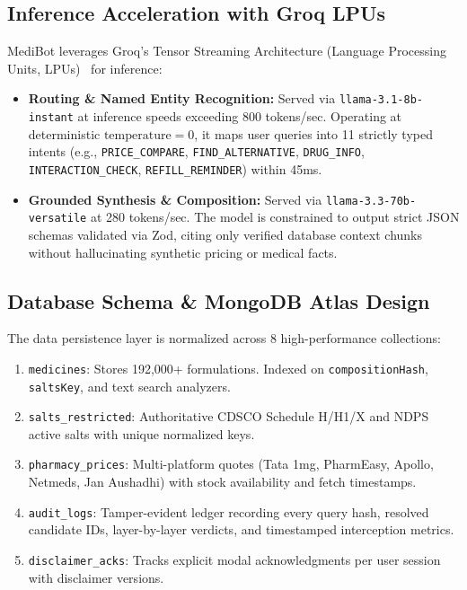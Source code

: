 \documentclass[11pt,a4paper]{article}
\begin{document}
\subsection{Inference Acceleration with Groq LPUs}
MediBot leverages Groq's Tensor Streaming Architecture (Language Processing Units, LPUs)~\cite{groq_lpu_2024} for inference:
\begin{itemize}[leftmargin=*]
  \item \textbf{Routing \& Named Entity Recognition:} Served via \texttt{llama-3.1-8b-instant} at inference speeds exceeding 800 tokens/sec. Operating at deterministic $\text{temperature} = 0$, it maps user queries into 11 strictly typed intents (e.g., \texttt{PRICE\_COMPARE}, \texttt{FIND\_ALTERNATIVE}, \texttt{DRUG\_INFO}, \texttt{INTERACTION\_CHECK}, \texttt{REFILL\_REMINDER}) within 45ms.
  \item \textbf{Grounded Synthesis \& Composition:} Served via \texttt{llama-3.3-70b-versatile} at 280 tokens/sec. The model is constrained to output strict JSON schemas validated via Zod, citing only verified database context chunks without hallucinating synthetic pricing or medical facts.
\end{itemize}

\subsection{Database Schema \& MongoDB Atlas Design}
The data persistence layer is normalized across 8 high-performance collections:
\begin{enumerate}[leftmargin=*]
  \item \texttt{medicines}: Stores 192,000+ formulations. Indexed on \texttt{compositionHash}, \texttt{saltsKey}, and text search analyzers.
  \item \texttt{salts\_restricted}: Authoritative CDSCO Schedule H/H1/X and NDPS active salts with unique normalized keys.
  \item \texttt{pharmacy\_prices}: Multi-platform quotes (Tata 1mg, PharmEasy, Apollo, Netmeds, Jan Aushadhi) with stock availability and fetch timestamps.
  \item \texttt{audit\_logs}: Tamper-evident ledger recording every query hash, resolved candidate IDs, layer-by-layer verdicts, and timestamped interception metrics.
  \item \texttt{disclaimer\_acks}: Tracks explicit modal acknowledgments per user session with disclaimer versions.
\end{enumerate}
\end{document}
